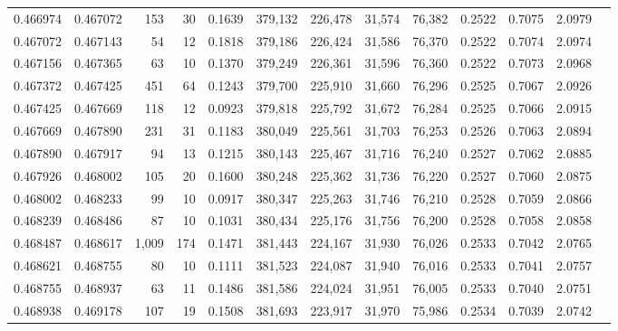 \begin{tabular}{rrrrrrrrrrrrr}
0.466974 & 0.467072 &   153 &  30 &                                     0.1639 & 379,132 & 226,478 &  31,574 &  76,382 & 0.2522 & 0.7075 & 2.0979 \\
0.467072 & 0.467143 &    54 &  12 &                                     0.1818 & 379,186 & 226,424 &  31,586 &  76,370 & 0.2522 & 0.7074 & 2.0974 \\
0.467156 & 0.467365 &    63 &  10 &                                     0.1370 & 379,249 & 226,361 &  31,596 &  76,360 & 0.2522 & 0.7073 & 2.0968 \\
0.467372 & 0.467425 &   451 &  64 &                                     0.1243 & 379,700 & 225,910 &  31,660 &  76,296 & 0.2525 & 0.7067 & 2.0926 \\
0.467425 & 0.467669 &   118 &  12 &                                     0.0923 & 379,818 & 225,792 &  31,672 &  76,284 & 0.2525 & 0.7066 & 2.0915 \\
0.467669 & 0.467890 &   231 &  31 &                                     0.1183 & 380,049 & 225,561 &  31,703 &  76,253 & 0.2526 & 0.7063 & 2.0894 \\
0.467890 & 0.467917 &    94 &  13 &                                     0.1215 & 380,143 & 225,467 &  31,716 &  76,240 & 0.2527 & 0.7062 & 2.0885 \\
0.467926 & 0.468002 &   105 &  20 &                                     0.1600 & 380,248 & 225,362 &  31,736 &  76,220 & 0.2527 & 0.7060 & 2.0875 \\
0.468002 & 0.468233 &    99 &  10 &                                     0.0917 & 380,347 & 225,263 &  31,746 &  76,210 & 0.2528 & 0.7059 & 2.0866 \\
0.468239 & 0.468486 &    87 &  10 &                                     0.1031 & 380,434 & 225,176 &  31,756 &  76,200 & 0.2528 & 0.7058 & 2.0858 \\
0.468487 & 0.468617 & 1,009 & 174 &                                     0.1471 & 381,443 & 224,167 &  31,930 &  76,026 & 0.2533 & 0.7042 & 2.0765 \\
0.468621 & 0.468755 &    80 &  10 &                                     0.1111 & 381,523 & 224,087 &  31,940 &  76,016 & 0.2533 & 0.7041 & 2.0757 \\
0.468755 & 0.468937 &    63 &  11 &                                     0.1486 & 381,586 & 224,024 &  31,951 &  76,005 & 0.2533 & 0.7040 & 2.0751 \\
0.468938 & 0.469178 &   107 &  19 &                                     0.1508 & 381,693 & 223,917 &  31,970 &  75,986 & 0.2534 & 0.7039 & 2.0742 \\

\end{tabular}
